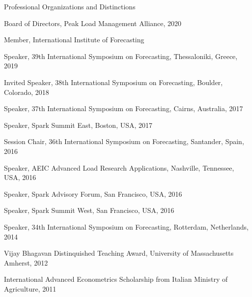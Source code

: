 \documentclass{resume} %
\begin{document}
\begin{rSection}{Professional Organizations and Distinctions}

\item Board of Directors, Peak Load Management Alliance, 2020
\item Member, International Institute of Forecasting
\item Speaker, 39th International Symposium on Forecasting, Thessaloniki, Greece, 2019
\item Invited Speaker, 38th International Symposium on Forecasting, Boulder, Colorado, 2018
\item Speaker, 37th International Symposium on Forecasting, Cairns, Australia, 2017
\item Speaker, Spark Summit East, Boston, USA, 2017
\item Session Chair, 36th International Symposium on Forecasting, Santander, Spain, 2016
\item Speaker, AEIC Advanced Load Research Applications, Nashville, Tennessee, USA, 2016
\item Speaker, Spark Advisory Forum, San Francisco, USA, 2016
\item Speaker, Spark Summit West, San Francisco, USA, 2016
\item Speaker, 34th International Symposium on Forecasting, Rotterdam, Netherlands, 2014
\item Vijay Bhagavan Distinquished Teaching Award, University of Massachusetts Amherst, 2012
\item International Advanced Econometrics Scholarship from Italian Ministry of Agriculture, 2011

\end{rSection}
\end{document}
